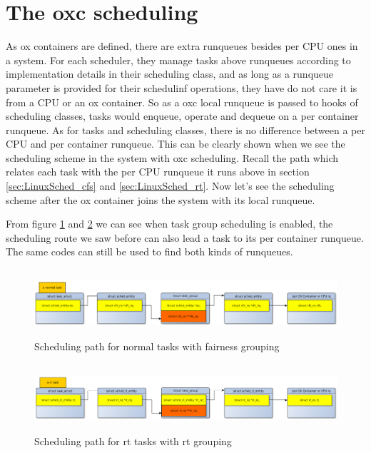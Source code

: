 \section{The oxc scheduling\label{sec:design_oxc_scheduling}}
As ox containers are defined, there are extra runqueues besides per CPU ones 
in a system. For each scheduler, they manage tasks above runqueues according
to implementation details in their scheduling class, and as long as a runqueue
parameter is provided for their schedulinf operations, they have do not care 
it is from a CPU or an ox container.
So as a oxc local runqueue is passed to hooks of scheduling classes, tasks would 
enqueue, operate and dequeue on a per container runqueue. As for tasks and scheduling
classes, there is no difference between a per CPU and per container runqueue.
This can be clearly shown when we see the scheduling scheme in the system 
with oxc scheduling. Recall the path which relates each
task with the per CPU runqueue it runs above in section \ref{sec:LinuxSched_cfs}
and \ref{sec:LinuxSched_rt}. Now let's see the scheduling scheme after the 
ox container joins the system with its local runqueue. 

From figure \ref{fig:oxc_fair_tg} and \ref{fig:oxc_rt_tg} we can see when 
task group scheduling is enabled, the scheduling route we saw before can also
lead a task to its per container runqueue. The same codes can still be used to
find both kinds of runqueues.

\begin{figure}[htbp]
        \centering
        \includegraphics[height=2.5cm, width=\textwidth]{images/cfs_scheduling_scheme_tg_oxc}
        \caption{Scheduling path for normal tasks with fairness grouping}
        \label{fig:oxc_fair_tg}
\end{figure}
\begin{figure}[htbp]
        \centering
        \includegraphics[height=2.5cm, width=\textwidth]{images/rt_scheduling_scheme_tg_oxc}
        \caption{Scheduling path for rt tasks with rt grouping}
        \label{fig:oxc_rt_tg}
\end{figure}

